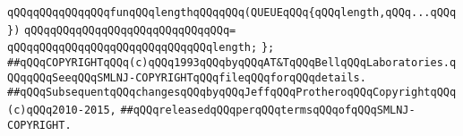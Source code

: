 \verb|qQQqqQQqqQQqqQQqfunqQQqlengthqQQqqQQq(QUEUEqQQq{qQQqlength,qQQq...qQQq})|\newline
\verb|qQQqqQQqqQQqqQQqqQQqqQQqqQQqqQQq=|\newline
\verb|qQQqqQQqqQQqqQQqqQQqqQQqqQQqqQQqlength;|\newline
\verb|};|\newline
\newline
\newline
\newline
\verb|##qQQqCOPYRIGHTqQQq(c)qQQq1993qQQqbyqQQqAT&TqQQqBellqQQqLaboratories.qQQqqQQqSeeqQQqSMLNJ-COPYRIGHTqQQqfileqQQqforqQQqdetails.|\newline
\verb|##qQQqSubsequentqQQqchangesqQQqbyqQQqJeffqQQqProtheroqQQqCopyrightqQQq(c)qQQq2010-2015,|\newline
\verb|##qQQqreleasedqQQqperqQQqtermsqQQqofqQQqSMLNJ-COPYRIGHT.|\newline


